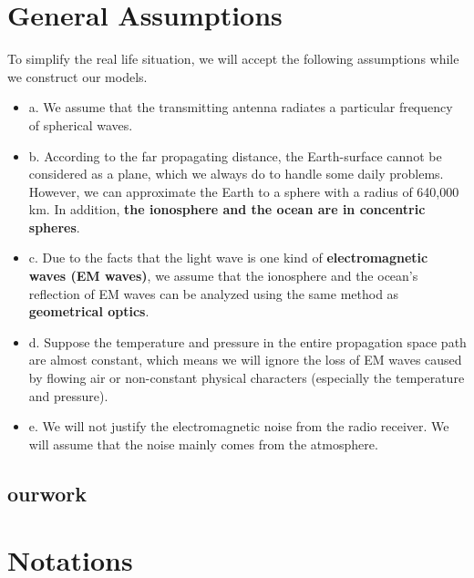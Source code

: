 \documentclass{mcmthesis}
\begin{document}
\section{General Assumptions}

    To simplify the real life situation, we will accept the following assumptions while we construct our models.

    \begin{itemize}

      \item a. We assume that the transmitting antenna radiates a particular frequency of spherical waves.

      \item b. According to the far propagating distance, the Earth-surface cannot be considered as a plane, which we always do to handle some daily problems. However, we can approximate the Earth  to a sphere with a radius of 640,000 km. In addition, \textbf{the ionosphere and the ocean are in concentric spheres}.

      \item c. Due to the facts that the light wave is one kind of \textbf{electromagnetic waves (EM waves)}, we assume that the ionosphere and the ocean's reflection of EM waves can be analyzed using the same method as \textbf{geometrical optics}.

      \item d. Suppose the temperature and pressure in the entire propagation space path are almost constant, which means we will ignore the loss of EM waves caused by flowing air or non-constant physical characters (especially the temperature and pressure).

      \item e. We will not justify the electromagnetic noise from the radio receiver. We will assume that the noise mainly comes from the atmosphere.

    \end{itemize}

    \subsection{ourwork}

\section{Notations}
\end{document}
